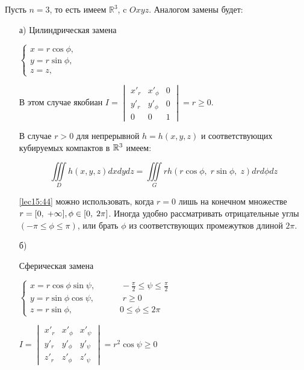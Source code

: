 \documentclass[../../main.tex]{subfiles}
\begin{document}
	\begin{exmp}
		Пусть $ n = 3 $, то есть имеем $ \mathbb{R}^3 $, c  $ Oxyz $. Аналогом замены
		будет:
		\begin{itemize}
			\item[а)]
			Цилиндрическая замена
			
			$\begin{cases}
				x = r \cos{\phi},\\
				y = r \sin{\phi},\\
				z = z,
			\end{cases}$
			
			В этом случае якобиан $I = \begin{vmatrix}
			x'_r & x'_\phi & 0 \\
			y'_r & y'_\phi & 0 \\
			0 & 0 & 1
			\end{vmatrix}=r\geq 0$.
			
			В случае $r > 0$ для непрерывной $h=h(x, y, z)$ и соответствующих
			кубируемых компактов в $\mathbb{R}^3$ имеем:
			
			\begin{equation}
			\label{lec15:44}
			\iiint\limits_{D} h(x, y, z) dx dy dz=
			\iiint\limits_{G} rh(r\cos{\phi},\; r\sin{\phi},\; z) dr d\phi dz
			\end{equation}
			
			\eqref{lec15:44} можно использовать, когда $r=0$ лишь на конечном множестве
			$r = [0,\;+\infty],\\ \phi \in [0,\; 2\pi]$. Иногда удобно рассматривать
			отрицательные углы $(-\pi \leq \phi \leq \pi)$, или брать $\phi$ из
			соответствующих промежутков длиной $2\pi$.
			
			\item[б)]
			
			Сферическая замена 
			
			$\begin{cases}
			x = r \cos{\phi} \sin{\psi},\;\;\;\;\;\;\;\;\;\;\;
			 -\frac{\pi}{2}\leq \psi \leq \frac{\pi}{2}\\
			y = r \sin{\phi} \cos{\psi},\;\;\;\;\;\;\;\;\;\;\;\; r \geq 0\\
			z = r \sin{\phi},\;\;\;\;\;\;\;\;\;\;\;\;\;\;\;\;\;\;\;\; 0 \leq \phi \leq 2\pi
			\end{cases}$
			
			 $I = \begin{vmatrix}
				x'_r & x'_\phi & x'_\psi \\
				y'_r & y'_\phi & y'_\psi \\
				z'_r & z'_\phi & z'_\psi
			\end{vmatrix}=r^2\cos{\psi}\geq 0$
			

\end{itemize}
\end{exmp}
\end{document}
